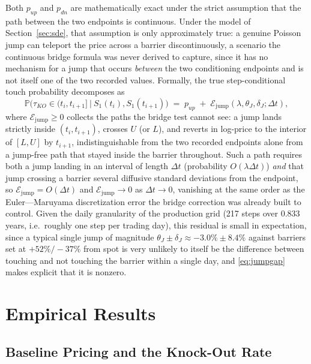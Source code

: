 \documentclass[11pt,a4paper]{article}
\begin{document}
Both $p_{up}$ and $p_{dn}$ are mathematically exact under the strict assumption that the path between the two endpoints is continuous. Under the model of Section~\ref{sec:sde}, that assumption is only approximately true: a genuine Poisson jump can teleport the price across a barrier discontinuously, a scenario the continuous bridge formula was never derived to capture, since it has no mechanism for a jump that occurs \emph{between} the two conditioning endpoints and is not itself one of the two recorded values. Formally, the true step-conditional touch probability decomposes as
\begin{equation}
\label{eq:jumpgap}
\mathbb P\big(\tau_{KO}\in(t_i,t_{i+1}]\ \big|\ S_1(t_i),S_1(t_{i+1})\big) \;=\; p_{up} \;+\; \mathcal E_{\mathrm{jump}}(\lambda,\theta_J,\delta_J;\Delta t),
\end{equation}
where $\mathcal E_{\mathrm{jump}}\ge0$ collects the paths the bridge test cannot see: a jump lands strictly inside $(t_i,t_{i+1})$, crosses $U$ (or $L$), and reverts in log-price to the interior of $[L,U]$ by $t_{i+1}$, indistinguishable from the two recorded endpoints alone from a jump-free path that stayed inside the barrier throughout. Such a path requires both a jump landing in an interval of length $\Delta t$ (probability $O(\lambda\Delta t)$) \emph{and} that jump crossing a barrier several diffusive standard deviations from the endpoint, so $\mathcal E_{\mathrm{jump}}=O(\Delta t)$ and $\mathcal E_{\mathrm{jump}}\to0$ as $\Delta t\to0$, vanishing at the same order as the Euler---Maruyama discretization error the bridge correction was already built to control. Given the daily granularity of the production grid (217 steps over 0.833 years, i.e.\ roughly one step per trading day), this residual is small in expectation, since a typical single jump of magnitude $\theta_J\pm\delta_J\approx-3.0\%\pm8.4\%$ against barriers set at $+52\%/-37\%$ from spot is very unlikely to itself be the difference between touching and not touching the barrier within a single day, and \eqref{eq:jumpgap} makes explicit that it is nonzero.

\section{Empirical Results}
\label{sec:results}

\subsection{Baseline Pricing and the Knock-Out Rate}
\label{sec:baseline}
\end{document}
